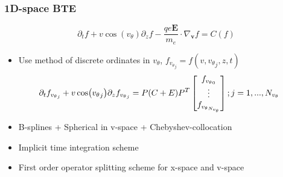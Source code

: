 \documentclass[mathserif, aspectratio=169]{beamer}
\newcommand{\vect}[1]{\boldsymbol{#1}}
\newcommand{\of}[1]{\mleft( #1 \mright)}
\newcommand{\vtheta}{{v_{\theta}}}
\begin{document}
\begin{frame}
	\frametitle{1D-space BTE}
	\begin{equation}
		\partial_t f + v\cos(\vtheta) \partial_z f -\frac{qe \vect{E}}{m_e} \cdot \nabla_{\vect{v}} f = C(f)
	\end{equation}
	\begin{itemize}
	\item Use method of discrete ordinates in $\vtheta$, $f_{\vtheta_j} = f(v, \vtheta_j, z, t)$
	\begin{align}
	\tiny
	&\partial_t f_{\vtheta_j} + v\cos\of{\vtheta_j} \partial_z f_{\vtheta_j} = P (C + E) P^{T}\begin{bmatrix}
	f_{\vtheta_0}\\
	\vdots\\
	f_{\vtheta_{N_\vtheta}}\\
	\end{bmatrix} ; j=1,..., N_{\vtheta}	\label{eq:bte_discreate}
	\end{align}
	\item B-splines + Spherical in v-space +  Chebyshev-collocation %
	\item Implicit time integration scheme
	\item First order operator splitting scheme for x-space and v-space
	\end{itemize}
\end{frame}
\end{document}
